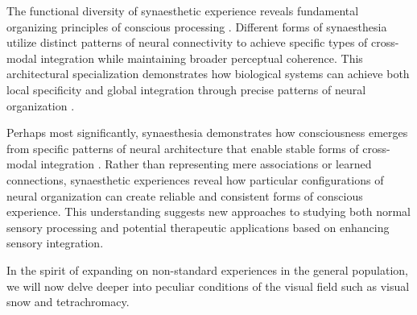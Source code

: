 The functional diversity of synaesthetic experience reveals fundamental organizing principles of conscious processing \cite{Grossenbacher2001}. Different forms of synaesthesia utilize distinct patterns of neural connectivity to achieve specific types of cross-modal integration while maintaining broader perceptual coherence. This architectural specialization demonstrates how biological systems can achieve both local specificity and global integration through precise patterns of neural organization \cite{Ward2013}.

Perhaps most significantly, synaesthesia demonstrates how consciousness emerges from specific patterns of neural architecture that enable stable forms of cross-modal integration \cite{Hubbard2005}. Rather than representing mere associations or learned connections, synaesthetic experiences reveal how particular configurations of neural organization can create reliable and consistent forms of conscious experience. This understanding suggests new approaches to studying both normal sensory processing and potential therapeutic applications based on enhancing sensory integration.

In the spirit of expanding on non-standard experiences in the general population, we will now delve deeper into peculiar conditions of the visual field such as visual snow and tetrachromacy.